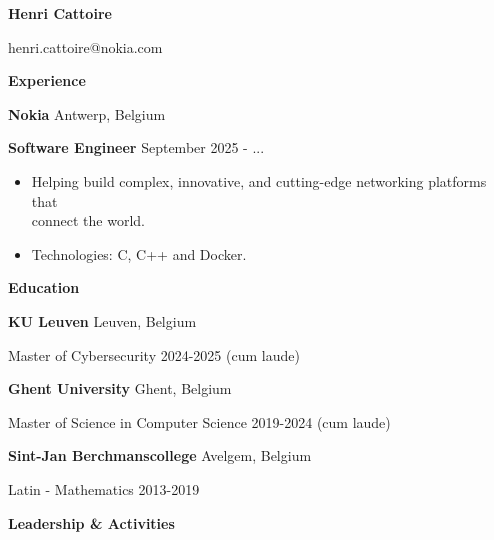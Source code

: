 \documentclass[11pt]{article}
\begin{document}
\begin{center}
    \textbf{Henri Cattoire}\\ 
    \hrulefill
\end{center}

\begin{center}
    henri.cattoire@nokia.com
\end{center}

\vspace{0.5pt}

\begin{center}
    \textbf{Experience}
\end{center}

\textbf{Nokia} \hfill Antwerp, Belgium

\textbf{Software Engineer} \hfill September 2025 - ...
\begin{itemize}[noitemsep, topsep=0pt, partopsep=0pt, parsep=0pt]
    \item Helping build complex, innovative, and cutting-edge networking platforms that \\ connect the world. 
    \item Technologies: C, C++ and Docker.
\end{itemize}

\vspace{12pt}

\begin{center}
    \textbf{Education}
\end{center}
\textbf{KU Leuven} \hfill Leuven, Belgium

Master of Cybersecurity \hfill 2024-2025 (cum laude)

\vspace{12pt}

\textbf{Ghent University} \hfill Ghent, Belgium

Master of Science in Computer Science \hfill 2019-2024 (cum laude)

\vspace{12pt}

\textbf{Sint-Jan Berchmanscollege} \hfill Avelgem, Belgium

Latin - Mathematics \hfill 2013-2019

\vspace{12pt}

\begin{center}
    \textbf{Leadership \& Activities}
\end{center}
\end{document}
